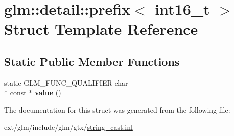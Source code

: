 \hypertarget{structglm_1_1detail_1_1prefix_3_01int16__t_01_4}{\section{glm\-:\-:detail\-:\-:prefix$<$ int16\-\_\-t $>$ Struct Template Reference}
\label{structglm_1_1detail_1_1prefix_3_01int16__t_01_4}
}
\subsection*{Static Public Member Functions}
\begin{DoxyCompactItemize}
\item 
\hypertarget{structglm_1_1detail_1_1prefix_3_01int16__t_01_4_a0ccbfcd8a1f5a2b777dbc43bad141bb6}{static G\-L\-M\-\_\-\-F\-U\-N\-C\-\_\-\-Q\-U\-A\-L\-I\-F\-I\-E\-R char \\*
const $\ast$ {\bfseries value} ()}\label{structglm_1_1detail_1_1prefix_3_01int16__t_01_4_a0ccbfcd8a1f5a2b777dbc43bad141bb6}

\end{DoxyCompactItemize}


The documentation for this struct was generated from the following file\-:\begin{DoxyCompactItemize}
\item 
ext/glm/include/glm/gtx/\hyperlink{string__cast_8inl}{string\-\_\-cast.\-inl}\end{DoxyCompactItemize}
